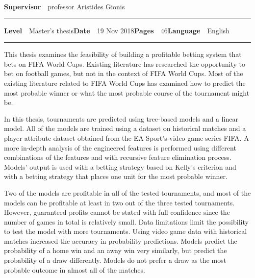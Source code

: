 \begin{spacing}{.88}
{{\fontsize{10.5pt}{10.5pt}\bfseries\sffamily\lsstyle Supervisor}~~{\small professor Aristides Gionis}

\vspace{-2.4mm}\rule{\textwidth}{.75pt}

{\fontsize{10.5pt}{10.5pt}\bfseries\sffamily\lsstyle Level}~~{\small Master's thesis}\hfill{\fontsize{10.5pt}{10.5pt}\bfseries\sffamily\lsstyle Date}~~{\small 19 Nov 2018}\hfill{\fontsize{10.5pt}{10.5pt}\bfseries\sffamily\lsstyle Pages}~~{\small 46}\hfill{\fontsize{10.5pt}{10.5pt}\bfseries\sffamily\lsstyle Language}~~{\small English}

\vspace{-2.4mm}\rule{\textwidth}{.75pt}

\vspace{6mm}

} %
\end{spacing}
\begin{spacing}{1.05}

\vspace{.8mm}

{\small
  This thesis examines the feasibility of building a profitable betting system that bets on FIFA World Cups. Existing literature has researched the opportunity to bet on football games, but not in the context of FIFA World Cups. Most of the existing literature related to FIFA World Cups has examined how to predict the most probable winner or what the most probable course of the tournament might be.

  In this thesis, tournaments are predicted using tree-based models and a linear model. All of the models are trained using a dataset on historical matches and a player attribute dataset obtained from the EA Sport's video game series FIFA. A more in-depth analysis of the engineered features is performed using different combinations of the features and with recursive feature elimination process. Models' output is used with a betting strategy based on Kelly's criterion and with a betting strategy that places one unit for the most probable winner.

  Two of the models are profitable in all of the tested tournaments, and most of the models can be profitable at least in two out of the three tested tournaments. However, guaranteed profits cannot be stated with full confidence since the number of games in total is relatively small. Data limitations limit the possibility to test the model with more tournaments. Using video game data with historical matches increased the accuracy in probability predictions. Models predict the probability of a home win and an away win very similarly, but predict the probability of a draw differently. Models do not prefer a draw as the most probable outcome in almost all of the matches.
}

\vfill

\end{spacing}
